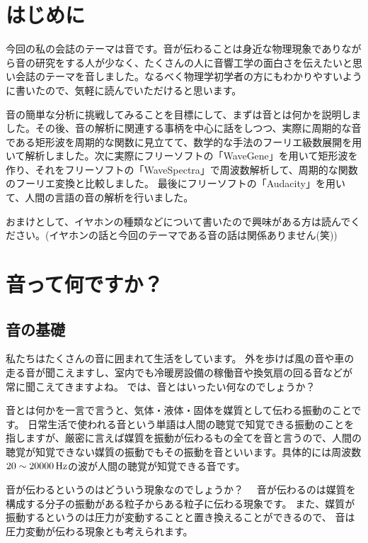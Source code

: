 \documentclass[11pt,b5paper,papersize,dvipdfmx]{jsbook}
\begin{document}

%
\section{はじめに}
今回の私の会誌のテーマは音です。音が伝わることは身近な物理現象でありながら音の研究をする人が少なく、たくさんの人に音響工学の面白さを伝えたいと思い会誌のテーマを音しました。なるべく物理学初学者の方にもわかりやすいように書いたので、気軽に読んでいただけると思います。\par
音の簡単な分析に挑戦してみることを目標にして、まずは音とは何かを説明しました。その後、音の解析に関連する事柄を中心に話をしつつ、実際に周期的な音である矩形波を周期的な関数に見立てて、数学的な手法のフーリエ級数展開を用いて解析しました。次に実際にフリーソフトの「WaveGene」を用いて矩形波を作り、それをフリーソフトの「WaveSpectra」で周波数解析して、周期的な関数のフーリエ変換と比較しました。
最後にフリーソフトの「Audacity」を用いて、人間の言語の音の解析を行いました。\par
おまけとして、イヤホンの種類などについて書いたので興味がある方は読んでください。(イヤホンの話と今回のテーマである音の話は関係ありません(笑))

\section{音って何ですか？}
%
\subsection{音の基礎}
私たちはたくさんの音に囲まれて生活をしています。
外を歩けば風の音や車の走る音が聞こえますし、室内でも冷暖房設備の稼働音や換気扇の回る音などが
常に聞こえてきますよね。
では、音とはいったい何なのでしょうか？\par
音とは何かを一言で言うと、気体・液体・固体を媒質として伝わる振動のことです。
日常生活で使われる音という単語は人間の聴覚で知覚できる振動のことを指しますが、厳密に言えば媒質を振動が伝わるもの全てを音と言うので、人間の聴覚が知覚できない媒質の振動でもその振動を音といいます。具体的には周波数$20\sim20000\tani{Hz}$の波が人間の聴覚が知覚できる音です。\par
音が伝わるというのはどういう現象なのでしょうか？　
音が伝わるのは媒質を構成する分子の振動がある粒子からある粒子に伝わる現象です。
また、媒質が振動するというのは圧力が変動することと置き換えることができるので、
音は圧力変動が伝わる現象とも考えられます。
%
\end{document}
